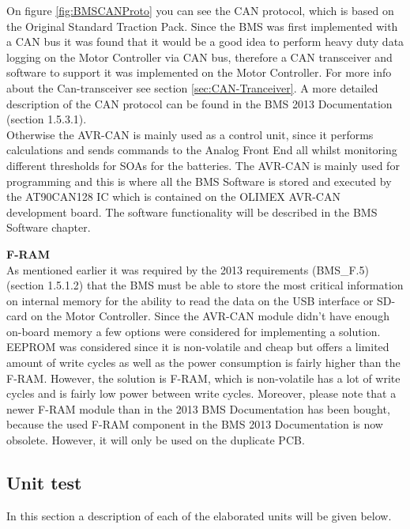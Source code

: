 On figure \vref{fig:BMSCANProto} you can see the CAN protocol, which is based on the Original Standard Traction Pack. Since the BMS was first implemented with a CAN bus it was found that it would be a good idea to perform heavy duty data logging on the Motor Controller via CAN bus, therefore a CAN transceiver and software to support it was implemented on the Motor Controller. For more info about the Can-transceiver see section \vref{sec:CAN-Tranceiver}. A more detailed description of the CAN protocol can be found in the BMS 2013 Documentation \cite{BMSDocumentation} (section 1.5.3.1).\\
Otherwise the AVR-CAN is mainly used as a control unit, since it performs calculations and sends commands to the Analog Front End all whilst monitoring different thresholds for SOAs for the batteries. The AVR-CAN is mainly used for programming and this is where all the BMS Software is stored and executed by the AT90CAN128 IC which is contained on the OLIMEX AVR-CAN development board. The software functionality will be described in the BMS Software chapter.

\textbf{F-RAM}\\
As mentioned earlier it was required by the 2013 requirements (BMS\_F.5)\cite{BMSDocumentation} (section 1.5.1.2) that the BMS must be able to store the most critical information on internal memory for the ability to read the data on the USB interface or SD-card on the Motor Controller. Since the AVR-CAN module didn't have enough on-board memory a few options were considered for implementing a solution. EEPROM was considered since it is non-volatile and cheap but offers a limited amount of write cycles as well as the power consumption is fairly higher than the F-RAM. However, the solution is F-RAM, which is non-volatile has a lot of write cycles and is fairly low power between write cycles. Moreover, please note that a newer F-RAM module than in the 2013 BMS Documentation has been bought, because the used F-RAM component in the BMS 2013 Documentation is now obsolete. However, it will only be used on the duplicate PCB.

\subsection{Unit test}
In this section a description of each of the elaborated units will be given below. 

